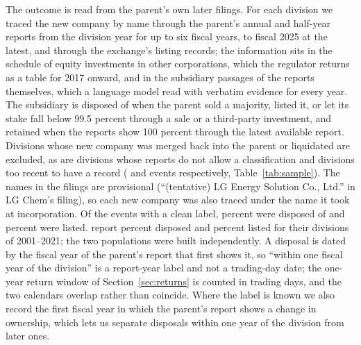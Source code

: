\begin{table}[htbp]
\centering
\caption{Sample: captive spin-offs, outcome labels, prices and ownership}\label{tab:sample}
{\footnotesize\setlength{\tabcolsep}{3pt}}
\end{table}

The outcome is read from the parent's own later filings. For each division we traced the new company by name through the parent's annual and half-year reports from the division year for up to six fiscal years, to fiscal 2025 at the latest, and through the exchange's listing records; the information sits in the schedule of equity investments in other corporations, which the regulator returns as a table for 2017 onward, and in the subsidiary passages of the reports themselves, which a language model read with verbatim evidence for every year. The subsidiary is disposed of when the parent sold a majority, listed it, or let its stake fall below 99.5 percent through a sale or a third-party investment, and retained when the reports show 100 percent through the latest available report. Divisions whose new company was merged back into the parent or liquidated are excluded, as are divisions whose reports do not allow a classification and divisions too recent to have a record (\NAllOther{} and \NAllUnresolved{} events respectively, Table~\ref{tab:sample}). The names in the filings are provisional (``(tentative) LG Energy Solution Co., Ltd.'' in LG Chem's filing), so each new company was also traced under the name it took at incorporation. Of the \NClean{} events with a clean label, \CleanDisposedShare{} percent were disposed of and \IPOShare{} percent were listed.  report \KLDisposed{} percent disposed and \KLListed{} percent listed for their \KLN{} divisions of 2001--2021; the two populations were built independently. A disposal is dated by the fiscal year of the parent's report that first shows it, so ``within one fiscal year of the division'' is a report-year label and not a trading-day date; the one-year return window of Section~\ref{sec:returns} is counted in trading days, and the two calendars overlap rather than coincide. Where the label is known we also record the first fiscal year in which the parent's report shows a change in ownership, which lets us separate disposals within one year of the division from later ones.

